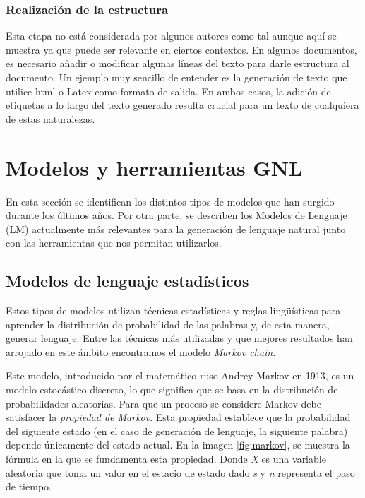 \subsubsection{Realización de la estructura}
Esta etapa no está considerada por algunos autores como tal aunque aquí se muestra ya que puede ser relevante en ciertos contextos. 
En algunos documentos, es necesario añadir o modificar algunas líneas del texto para darle estructura al documento. Un ejemplo muy sencillo de entender es la generación de texto que utilice html o Latex como formato de salida. En ambos casos, la adición de etiquetas a lo largo del texto generado resulta crucial para un texto de cualquiera de estas naturalezas.


\section{Modelos y herramientas GNL}
\label{sec:modelos}
En esta sección se identifican los distintos tipos de modelos que han surgido durante los últimos años. Por otra parte, se describen los Modelos de Lenguaje (LM) actualmente más relevantes para la generación de lenguaje natural junto con las herramientas que nos permitan utilizarlos.

\subsection{Modelos de lenguaje estadísticos}
Estos tipos de modelos utilizan técnicas estadísticas y reglas lingüísticas para aprender la distribución de probabilidad de las palabras y, de esta manera, generar lenguaje. Entre las técnicas más utilizadas y que mejores resultados han arrojado en este ámbito encontramos el modelo \textit{Markov chain}.



Este modelo, introducido por el matemático ruso Andrey Markov en 1913, es un modelo estocástico discreto, lo que significa que se basa en la distribución de probabilidades aleatorias. Para que un proceso se considere Markov debe satisfacer la \textit{propiedad de Markov}. Esta propiedad establece que  la probabilidad del siguiente estado (en el caso de generación de lenguaje, la siguiente palabra) depende únicamente del estado actual. En la imagen \ref{fig:markov}, se muestra la fórmula en la que se fundamenta esta propiedad. Donde \textit{X} es una variable aleatoria que toma un valor en el estacio de estado dado \textit{s} y \textit{n} representa el paso de tiempo\citep{howell_2022}. 

